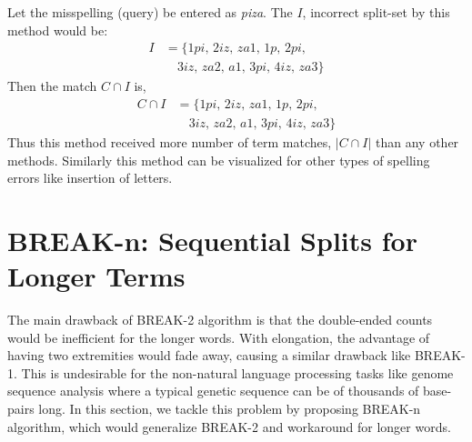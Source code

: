 Let the misspelling (query) be entered as \textit{piza}. The $I$, incorrect split-set by this method would be:
\begin{equation*}
	\begin{aligned}
		I &= \lbrace \textit{1pi, 2iz, za1, 1p, 2pi,} \\ 
		&\quad \textit{3iz, za2, a1, 3pi, 4iz, za3} \rbrace
	\end{aligned}
\end{equation*}
Then the match $C \cap I$ is,
\begin{equation*}
	\begin{aligned}
		C \cap I &= \lbrace \textit{1pi, 2iz, za1, 1p, 2pi,} \\ 
		&\quad \textit{3iz, za2, a1, 3pi, 4iz, za3} \rbrace
	\end{aligned}
\end{equation*}
Thus this method received more number of term matches, $ | C  \cap I | $ than any other methods. Similarly this method can be visualized for other types of spelling errors like insertion of letters. 


\section{BREAK-n: Sequential Splits for Longer Terms}

The main drawback of BREAK-2 algorithm is that the double-ended counts would be inefficient for the longer words. 
With elongation, the advantage of having two extremities would fade away, causing a similar drawback like BREAK-1.
This is undesirable for the non-natural language processing tasks like genome sequence analysis where a typical genetic sequence can be of thousands of base-pairs long.
In this section, we tackle this problem by proposing BREAK-n algorithm, which would generalize BREAK-2 and workaround for longer words.
